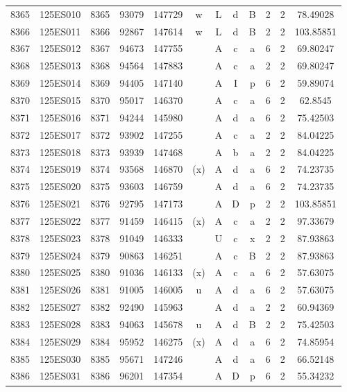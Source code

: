 \begin{tabular}{|*{12}{c|}}
8365 & 125ES010 & 8365 & 93079 & 147729 & w & L & d & B & 2 & 2 & 78.49028 \\ 
8366 & 125ES011 & 8366 & 92867 & 147614 & w & L & d & B & 2 & 2 & 103.85851 \\ 
8367 & 125ES012 & 8367 & 94673 & 147755 &  & A & c & a & 6 & 2 & 69.80247 \\ 
8368 & 125ES013 & 8368 & 94564 & 147883 &  & A & c & a & 2 & 2 & 69.80247 \\ 
8369 & 125ES014 & 8369 & 94405 & 147140 &  & A & I & p & 6 & 2 & 59.89074 \\ 
8370 & 125ES015 & 8370 & 95017 & 146370 &  & A & c & a & 6 & 2 & 62.8545 \\ 
8371 & 125ES016 & 8371 & 94244 & 145980 &  & A & d & a & 6 & 2 & 75.42503 \\ 
8372 & 125ES017 & 8372 & 93902 & 147255 &  & A & c & a & 2 & 2 & 84.04225 \\ 
8373 & 125ES018 & 8373 & 93939 & 147468 &  & A & b & a & 2 & 2 & 84.04225 \\ 
8374 & 125ES019 & 8374 & 93568 & 146870 & (x) & A & d & a & 6 & 2 & 74.23735 \\ 
8375 & 125ES020 & 8375 & 93603 & 146759 &  & A & d & a & 6 & 2 & 74.23735 \\ 
8376 & 125ES021 & 8376 & 92795 & 147173 &  & A & D & p & 2 & 2 & 103.85851 \\ 
8377 & 125ES022 & 8377 & 91459 & 146415 & (x) & A & c & a & 2 & 2 & 97.33679 \\ 
8378 & 125ES023 & 8378 & 91049 & 146333 &  & U & c & x & 2 & 2 & 87.93863 \\ 
8379 & 125ES024 & 8379 & 90863 & 146251 &  & A & c & B & 2 & 2 & 87.93863 \\ 
8380 & 125ES025 & 8380 & 91036 & 146133 & (x) & A & c & a & 6 & 2 & 57.63075 \\ 
8381 & 125ES026 & 8381 & 91005 & 146005 & u & A & d & a & 6 & 2 & 57.63075 \\ 
8382 & 125ES027 & 8382 & 92490 & 145963 &  & A & d & a & 2 & 2 & 60.94369 \\ 
8383 & 125ES028 & 8383 & 94063 & 145678 & u & A & d & B & 2 & 2 & 75.42503 \\ 
8384 & 125ES029 & 8384 & 95952 & 146275 & (x) & A & d & a & 6 & 2 & 74.85954 \\ 
8385 & 125ES030 & 8385 & 95671 & 147246 &  & A & d & a & 6 & 2 & 66.52148 \\ 
8386 & 125ES031 & 8386 & 96201 & 147354 &  & A & D & p & 6 & 2 & 55.34232 \\ 

\end{tabular}
